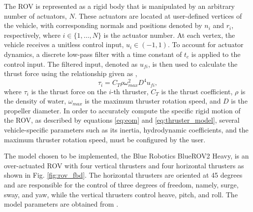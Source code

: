 The \ac{ROV} is represented as a rigid body that is manipulated by an arbitrary number of actuators, $N$. These actuators are located at user-defined vertices of the vehicle, with corresponding normals and positions denoted by $n_i$ and $r_i$, respectively, where $i \in \{1,\dots, N\}$ is the actuator number. %
At each vertex, the vehicle receives a unitless control input, $u_i\in (-1,1)$. To account for actuator dynamics, a discrete low-pass filter with a time constant of $t_c$ is applied to the control input. The filtered input, denoted as $u_{fi}$, is then used to calculate the thrust force using the relationship given as \cite{rw:shah2018airsim},
%
\begin{equation}\label{eq:thruster_model}
  \tau_i = C_T \rho \omega^2_{max} D^4 u_{fi}, 
\end{equation}
%
where $\tau_i$ is the thrust force on the $i$-th thruster, $C_T$ is the thrust coefficient, $\rho$ is the density of water, $\omega_{max}$ is the maximum thruster rotation speed, and $D$ is the propeller diameter. 
In order to accurately compute the specific rigid motion of the \ac{ROV}, as described by equations \eqref{eq:eom} and \eqref{eq:thruster_model}, several vehicle-specific parameters such as its inertia, hydrodynamic coefficients, and the maximum thruster rotation speed, must be configured by the user. %

The model chosen to be implemented, the Blue Robotics BlueROV2 Heavy, is an over-actuated \ac{ROV} with four vertical thrusters and four horizontal thrusters as shown in Fig. \ref{fig:rov_fbd}. The horizontal thrusters are oriented at 45 degrees and are responsible for the control of three degrees of freedom, namely, surge, sway, and yaw, while the vertical thrusters control heave, pitch, and roll. The model parameters are obtained from \cite{bluerov2_h}. 






